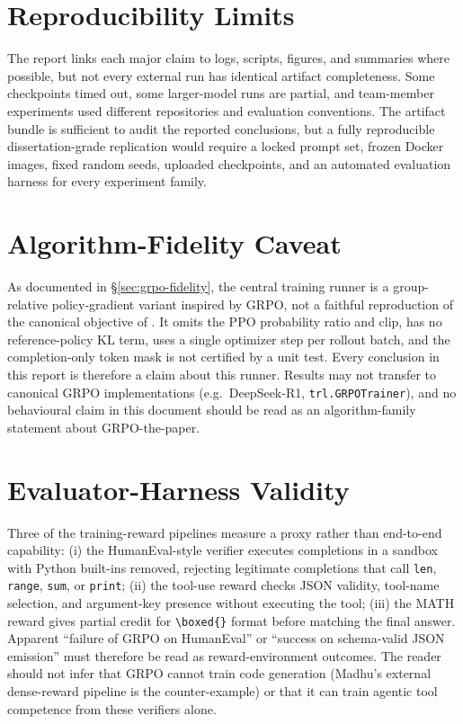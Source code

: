 \documentclass[12pt,a4paper]{report}
\begin{document}
\section*{Reproducibility Limits}
The report links each major claim to logs, scripts, figures, and summaries where possible, but not every external run has identical artifact completeness. Some checkpoints timed out, some larger-model runs are partial, and team-member experiments used different repositories and evaluation conventions. The artifact bundle is sufficient to audit the reported conclusions, but a fully reproducible dissertation-grade replication would require a locked prompt set, frozen Docker images, fixed random seeds, uploaded checkpoints, and an automated evaluation harness for every experiment family.

\section*{Algorithm-Fidelity Caveat}
As documented in §\ref{sec:grpo-fidelity}, the central training runner is a group-relative policy-gradient variant inspired by GRPO, not a faithful reproduction of the canonical objective of \citet{shao2024deepseekmath}. It omits the PPO probability ratio and clip, has no reference-policy KL term, uses a single optimizer step per rollout batch, and the completion-only token mask is not certified by a unit test. Every conclusion in this report is therefore a claim about this runner. Results may not transfer to canonical GRPO implementations (e.g.\ DeepSeek-R1, \texttt{trl.GRPOTrainer}), and no behavioural claim in this document should be read as an algorithm-family statement about GRPO-the-paper.

\section*{Evaluator-Harness Validity}
Three of the training-reward pipelines measure a proxy rather than end-to-end capability: (i) the HumanEval-style verifier executes completions in a sandbox with Python built-ins removed, rejecting legitimate completions that call \texttt{len}, \texttt{range}, \texttt{sum}, or \texttt{print}; (ii) the tool-use reward checks JSON validity, tool-name selection, and argument-key presence without executing the tool; (iii) the MATH reward gives partial credit for \verb|\boxed{}| format before matching the final answer. Apparent ``failure of GRPO on HumanEval'' or ``success on schema-valid JSON emission'' must therefore be read as reward-environment outcomes. The reader should not infer that GRPO cannot train code generation (Madhu's external dense-reward pipeline is the counter-example) or that it can train agentic tool competence from these verifiers alone.
\end{document}
